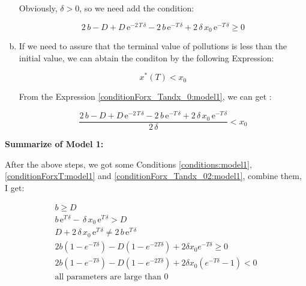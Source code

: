 \documentclass{article}
\begin{document}
\begin{enumerate}[a)]
    Obviously, $\delta>0$, so we need add the condition:

    \begin{equation}\label{conditionForxT:model1}
        2\,b-D+D\,{\mathrm{e}}^{-2\,T\,\delta }-2\,b\,{\mathrm{e}}^{-T\,\delta }+2\,\delta \,x_{0}\,{\mathrm{e}}^{-T\,\delta }\geq 0
    \end{equation}

    \item If we need to assure that the terminal value of pollutions is less than the initial value, we can abtain the conditon by the following Expression:
    
    \begin{equation}\label{conditionForx_Tandx_0:model1}
        x^*(T)<x_0
    \end{equation}

    From the Expression \eqref{conditionForx_Tandx_0:model1}, we can get :

    \begin{equation}\label{conditionForx_Tandx_02:model1}
      \frac{2\,b-D+D\,{\mathrm{e}}^{-2\,T\,\delta }-2\,b\,{\mathrm{e}}^{-T\,\delta }+2\,\delta \,x_{0}\,{\mathrm{e}}^{-T\,\delta }}{2\,\delta }<x_0
    \end{equation}

\end{enumerate}

{\bf Summarize of Model 1:}

After the above steps, we got some Conditions \eqref{conditions:model1}, \eqref{conditionForxT:model1} and \eqref{conditionForx_Tandx_02:model1}, combine them, I get:

\begin{equation}\label{conditions:finally_model1}
    \begin{split}
        b\geq D\\
        b\,{\mathrm{e}}^{T\,\delta }-\,\delta \,x_{0}\,{\mathrm{e}}^{T\,\delta }>D\\
        D+2\,\delta \,x_{0}\,{\mathrm{e}}^{T\,\delta }\neq 2\,b\,{\mathrm{e}}^{T\,\delta }\\
        2b(1-e^{-T\delta})-D(1-e^{-2T\delta})+2\delta x_0e^{-T\delta}\geq 0\\
        2b(1-e^{-T\delta})-D(1-e^{-2T\delta})+2\delta x_0(e^{-T\delta}-1)< 0\\
        \text{all parameters are large than 0}
    \end{split}
\end{equation}
\end{document}
